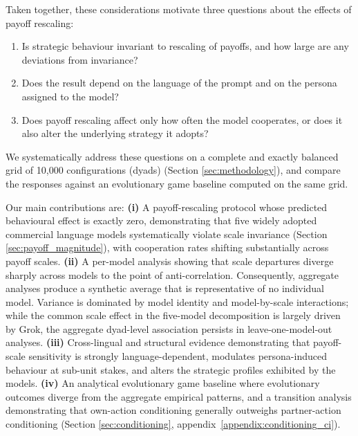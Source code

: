 \documentclass[11pt,a4paper]{article}
\newcommand{\rev}[1]{{\color{red}#1}}
\newcommand{\rev}[1]{#1}
\begin{document}
Taken together, these considerations motivate three questions about the effects of payoff rescaling:
\begin{enumerate}[(1)]
\item Is strategic behaviour invariant to   rescaling of payoffs, and how large are any deviations from invariance?
\item Does the result depend on the language of the prompt and on the persona assigned to the model?

\item Does payoff rescaling affect only how often the model  cooperates, or does it also alter the underlying strategy it adopts?

\end{enumerate}
We systematically address these questions on a complete and exactly balanced grid of 10{,}000 configurations (dyads)
(Section \ref{sec:methodology}), and compare the responses against an evolutionary game
baseline computed on the same grid.

Our main contributions  are: \textbf{(i)} A payoff-rescaling protocol whose predicted behavioural
effect is exactly zero, demonstrating that five widely adopted commercial language models systematically violate scale invariance (Section \ref{sec:payoff_magnitude}), with
cooperation rates shifting substantially across payoff scales. \textbf{(ii)} A
per-model analysis showing that scale departures diverge sharply across
models to the point of anti-correlation. Consequently, aggregate analyses produce a synthetic average that is representative of no individual model. Variance is dominated by model identity and model-by-scale interactions; while the common scale effect in the five-model decomposition is largely driven by Grok, the aggregate dyad-level association persists in leave-one-model-out analyses\rev{.} \textbf{(iii)} Cross-lingual and structural evidence demonstrating that payoff-scale sensitivity is strongly language-dependent, modulates persona-induced behaviour at sub-unit stakes, and alters the strategic profiles exhibited by the models.
\textbf{(iv)} An analytical evolutionary game baseline where evolutionary outcomes diverge from the aggregate empirical patterns, and a transition analysis demonstrating  that own-action  conditioning generally outweighs partner-action conditioning (Section \ref{sec:conditioning}, appendix~\ref{appendix:conditioning_ci}).
\end{document}
